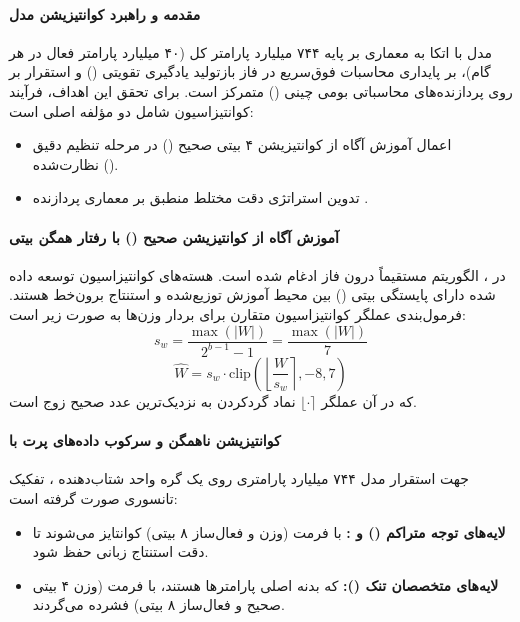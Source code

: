 \item {}

\paragraph*{مقدمه و راهبرد کوانتیزیشن مدل}
مدل  \cite{zeng2026glm5} با اتکا به معماری بر پایه ۷۴۴ میلیارد پارامتر کل (۴۰ میلیارد پارامتر فعال در هر گام)، بر پایداری محاسبات فوق‌سریع در فاز بازتولید یادگیری تقویتی () و استقرار بر روی پردازنده‌های محاسباتی بومی چینی () متمرکز است. برای تحقق این اهداف، فرآیند کوانتیزاسیون شامل دو مؤلفه اصلی است:
\begin{itemize}
    \item اعمال آموزش آگاه از کوانتیزیشن ۴ بیتی صحیح () در مرحله تنظیم دقیق نظارت‌شده ().
    \item تدوین استراتژی دقت مختلط  منطبق بر معماری پردازنده .
\end{itemize}

\paragraph*{آموزش آگاه از کوانتیزیشن صحیح () با رفتار همگن بیتی}
در ، الگوریتم  مستقیماً درون فاز  ادغام شده است. هسته‌های کوانتیزاسیون توسعه داده شده دارای پایستگی بیتی () بین محیط آموزش توزیع‌شده و استنتاج برون‌خط هستند. فرمول‌بندی عملگر کوانتیزاسیون متقارن برای بردار وزن‌ها به صورت زیر است:
\begin{equation}
    s_w = \frac{\max(|W|)}{2^{b-1} - 1} = \frac{\max(|W|)}{7}
\end{equation}
\begin{equation}
    \hat{W} = s_w \cdot \text{clip}\left( \left\lfloor \frac{W}{s_w} \right\rceil, -8, 7 \right)
\end{equation}
که در آن عملگر $\lfloor \cdot \rceil$ نماد گردکردن به نزدیک‌ترین عدد صحیح زوج است.

\paragraph*{کوانتیزیشن ناهمگن  و سرکوب داده‌های پرت با }
جهت استقرار مدل ۷۴۴ میلیارد پارامتری روی یک گره واحد شتاب‌دهنده ، تفکیک تانسوری صورت گرفته است:
\begin{itemize}
    \item \textbf{لایه‌های توجه متراکم () و :} با فرمت  (وزن و فعال‌ساز ۸ بیتی) کوانتایز می‌شوند تا دقت استنتاج زبانی حفظ شود.
    \item \textbf{لایه‌های متخصصان تنک ():} که بدنه اصلی پارامترها هستند، با فرمت  (وزن ۴ بیتی صحیح و فعال‌ساز ۸ بیتی) فشرده می‌گردند.
\end{itemize}

